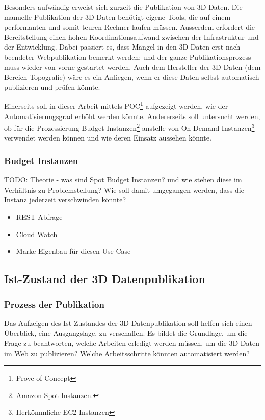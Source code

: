 Besonders aufwändig erweist sich zurzeit die Publikation von 3D Daten. Die manuelle Publikation
der 3D Daten benötigt eigene Tools, die auf einem performanten und somit teuren Rechner laufen
müssen. Ausserdem erfordert die Bereitstellung einen hohen Koordinationsaufwand zwischen der
Infrastruktur und der Entwicklung. Dabei passiert es, dass Mängel in den 3D Daten erst nach
beendeter Webpublikation bemerkt werden; und der ganze Publikationsprozess muss wieder von
vorne gestartet werden.
Auch dem Hersteller der 3D Daten (dem Bereich Topografie) wäre es ein Anliegen, wenn er diese
Daten selbst automatisch publizieren und prüfen könnte.

Einerseits soll in dieser Arbeit mittels POC\footnote{Prove of Concept} aufgezeigt werden, wie der Automatisierungsgrad erhöht werden könnte. Andererseits soll untersucht werden, ob für die Prozessierung Budget Instanzen\footnote{Amazon Spot Instanzen.} anstelle von On-Demand Instanzen\footnote{Herkömmliche EC2 Instanzen} verwendet werden können und wie deren Einsatz aussehen könnte.

\subsubsection{Budget Instanzen}

TODO: Theorie - was sind Spot Budget Instanzen? und wie stehen diese im Verhältnis zu Problemstellung? Wie soll damit umgegangen werden, dass die Instanz jederzeit verschwinden könnte?

\begin{itemize}
\item REST Abfrage
\item Cloud Watch
\item Marke Eigenbau für diesen Use Case
\end{itemize}


\subsection{Ist-Zustand der 3D Datenpublikation}
\subsubsection{Prozess der Publikation}
Das Aufzeigen des Ist-Zustandes der 3D Datenpublikation soll helfen sich einen Überblick, eine Ausgangslage, zu verschaffen. Es bildet die Grundlage, um die Frage zu beantworten, welche Arbeiten erledigt werden müssen, um die 3D Daten im Web zu publizieren? Welche Arbeitsschritte könnten automatisiert werden? 


